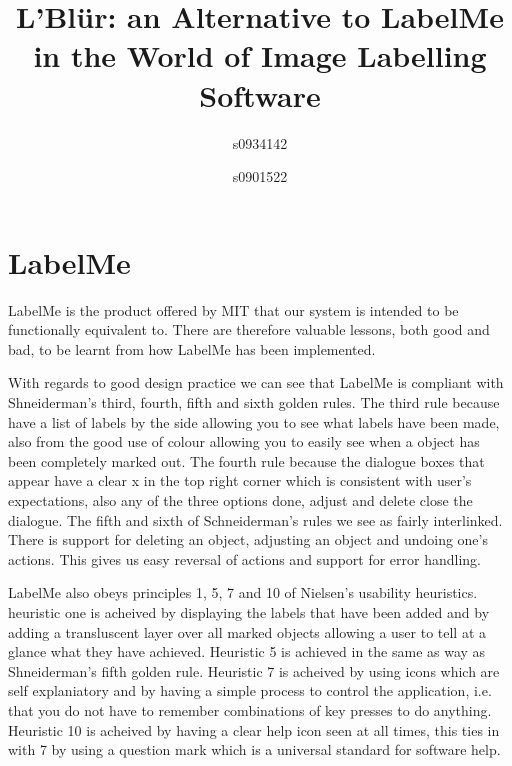 \documentclass[a4paper,11pt,oneside]{article}
\begin{document}
\title{L'Bl\"{u}r: an Alternative to LabelMe in the World of Image Labelling Software}
\author{s0934142 \and s0901522}
\maketitle

\tableofcontents

\section{LabelMe}
LabelMe is the product offered by MIT that our system is intended to be
functionally equivalent to.  There are therefore valuable lessons, both good and
bad, to be learnt from how LabelMe has been implemented.

With regards to good design practice we can see that LabelMe is compliant with
Shneiderman's third, fourth, fifth and sixth golden rules.  The third rule
because have a list of labels by the side allowing you to see what labels have
been made, also from the good use of colour allowing you to easily see when a
object has been completely marked out.  The fourth rule because the dialogue
boxes that appear have a clear x in the top right corner which is consistent
with user's expectations, also any of the three options done, adjust and delete
close the dialogue.  The fifth and sixth of Schneiderman's rules we see as
fairly interlinked.  There is support for deleting an object, adjusting an
object and undoing one's actions.  This gives us easy reversal of actions and
support for error handling.

LabelMe also obeys principles 1, 5, 7 and 10 of Nielsen's usability heuristics. 
heuristic one is acheived by displaying the labels that have been added and by
adding a transluscent layer over all marked objects allowing a user to tell at a
glance what they have achieved.  Heuristic 5 is achieved in the same as way as
Shneiderman's fifth golden rule.  Heuristic 7 is acheived by using icons which
are self explaniatory and by having a simple process to control the application,
 i.e. that you do not have to remember combinations of key presses to do
anything. Heuristic 10 is acheived by having a clear help icon seen at all
times, this ties in with 7 by using a question mark which is a universal
standard for software help.
\end{document}
